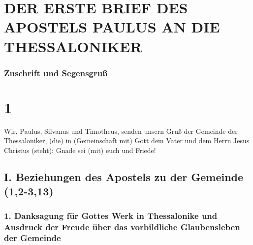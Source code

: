 \hypertarget{der-erste-brief-des-apostels-paulus-an-die-thessaloniker}{%
\section{DER ERSTE BRIEF DES APOSTELS PAULUS AN DIE
THESSALONIKER}\label{der-erste-brief-des-apostels-paulus-an-die-thessaloniker}}

\hypertarget{zuschrift-und-segensgruuxdf}{%
\subsubsection{Zuschrift und
Segensgruß}\label{zuschrift-und-segensgruuxdf}}

\hypertarget{section}{%
\section{1}\label{section}}

 Wir, Paulus, Silvanus und Timotheus, senden unsern Gruß
der Gemeinde der Thessaloniker, (die) in (Gemeinschaft mit) Gott dem
Vater und dem Herrn Jesus Christus (steht): Gnade sei (mit) euch und
Friede!

\hypertarget{i.-beziehungen-des-apostels-zu-der-gemeinde-12-313}{%
\subsection{I. Beziehungen des Apostels zu der Gemeinde
(1,2-3,13)}\label{i.-beziehungen-des-apostels-zu-der-gemeinde-12-313}}

\hypertarget{danksagung-fuxfcr-gottes-werk-in-thessalonike-und-ausdruck-der-freude-uxfcber-das-vorbildliche-glaubensleben-der-gemeinde}{%
\subsubsection{1. Danksagung für Gottes Werk in Thessalonike und
Ausdruck der Freude über das vorbildliche Glaubensleben der
Gemeinde}\label{danksagung-fuxfcr-gottes-werk-in-thessalonike-und-ausdruck-der-freude-uxfcber-das-vorbildliche-glaubensleben-der-gemeinde}}

